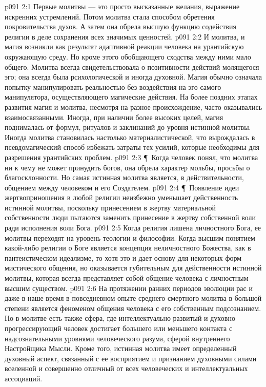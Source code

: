 \vs p091 2:1 Первые молитвы --- это просто высказанные желания, выражение искренних устремлений. Потом молитва стала способом обретения покровительства духов. А затем она обрела высшую функцию содействия религии в деле сохранения всех значимых ценностей.
\vs p091 2:2 И молитва, и магия возникли как результат адаптивной реакции человека на урантийскую окружающую среду. Но кроме этого обобщающего сходства между ними мало общего. Молитва всегда свидетельствовала о позитивности действий молящегося эго; она всегда была рсихологической и иногда духовной. Магия обычно означала попытку манипулировать реальностью без воздействия на эго самого манипулятора, осуществляющего магические действия. На более поздних этапах развития магия и молитва, несмотря на разное происхождение, часто оказывались взаимосвязанными. Иногда, при наличии более высоких целей, магия поднималась от формул, ритуалов и заклинаний до уровня истинной молитвы. Иногда молитва становилась настолько материалистической, что вырождалась в псевдомагический способ избежать затраты тех усилий, которые необходимы для разрешения урантийских проблем.
\vs p091 2:3 \P\ Когда человек понял, что молитва ни к чему не может принудить богов, она обрела характер мольбы, просьбы о благосклонности. Но самая истинная молитва является, в действительности, общением между человеком и его Создателем.
\vs p091 2:4 \P\ Появление идеи жертвоприношения в любой религии неизбежно уменьшает действенность истинной молитвы, поскольку принесением в жертву материальной собственности люди пытаются заменить принесение в жертву собственной воли ради исполнения воли Бога.
\vs p091 2:5 Когда религия лишена личностного Бога, ее молитвы переходят на уровень теологии и философии. Когда высшим понятием какой\hyp{}либо религии о Боге является концепция неличностного Божества, как в пантеистическом идеализме, то хотя это и дает основу для некоторых форм мистического общения, но оказывается губительным для действенности истинной молитвы, которая всегда представляет собой общение человека с личностным высшим существом.
\vs p091 2:6 На протяжении ранних периодов эволюции рас и даже в наше время в повседневном опыте среднего смертного молитва в большой степени является феноменом общения человека с его собственным подсознанием. Но в молитве есть также сфера, где интеллектуально развитый и духовно прогрессирующий человек достигает большего или меньшего контакта с надсознательными уровнями человеческого разума, сферой внутреннего Настройщика Мысли. Кроме того, истинная молитва имеет определенный духовный аспект, связанный с ее восприятием и признанием духовными силами вселенной и совершенно отличный от всех человеческих и интеллектуальных ассоциаций.
